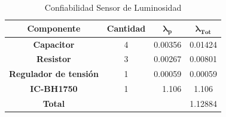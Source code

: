 \begin{table}[H]
\centering
\begin{tabular}{|c|crc|}
\hline
\textbf{Componente}           & \multicolumn{1}{c|}{\textbf{Cantidad}} & \multicolumn{1}{c|}{$\boldsymbol{\lambda_p}$}        & $\boldsymbol{\lambda_{Tot}}$ \\ \hline
\textbf{Capacitor}            & \multicolumn{1}{c|}{4}                 & \multicolumn{1}{r|}{0.00356}                         & 0.01424                      \\ \hline
\textbf{Resistor}             & \multicolumn{1}{c|}{3}                 & \multicolumn{1}{r|}{\cellcolor[HTML]{FFFFFF}0.00267} & 0.00801                      \\ \hline
\textbf{Regulador de tensión} & \multicolumn{1}{c|}{1}                 & \multicolumn{1}{r|}{\cellcolor[HTML]{FFFFFF}0.00059} & 0.00059                      \\ \hline
\textbf{IC-BH1750}            & \multicolumn{1}{c|}{1}                 & \multicolumn{1}{r|}{1.106}                           & 1.106                        \\ \hline
\textbf{Total}                & \multicolumn{1}{l}{}                   & \multicolumn{1}{l}{}                                 & \multicolumn{1}{r|}{1.12884} \\ \hline
\end{tabular}
\caption{Confiabilidad Sensor de Luminosidad}
\label{tab:conflum}
\end{table}

